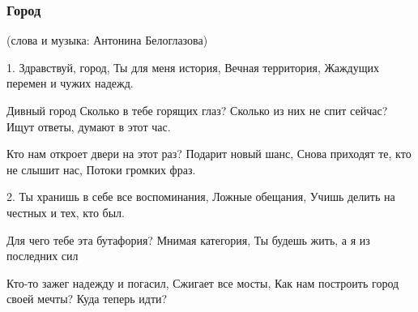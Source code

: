  
 
 

\subsubsection{Город}
\label{sec:poetry.rus.tonya_beloglazova.gorod}

(слова и музыка: Антонина Белоглазова)

1. Здравствуй, город,
Ты для меня история,
Вечная территория,
Жаждущих перемен и чужих надежд.

Дивный город
Сколько в тебе горящих глаз?
Сколько из них не спит сейчас?
Ищут ответы, думают в этот час.

Кто нам откроет двери на этот раз?
Подарит новый шанс,
Снова приходят те, кто не слышит нас,
Потоки громких фраз.

2. Ты хранишь в себе все воспоминания,
Ложные обещания,
Учишь делить на честных и тех, кто был.

Для чего тебе эта бутафория?
Мнимая категория,
Ты будешь жить, а я из последних сил

Кто-то зажег надежду и погасил,
Сжигает все мосты,
Как нам построить город своей мечты?
Куда теперь идти?

